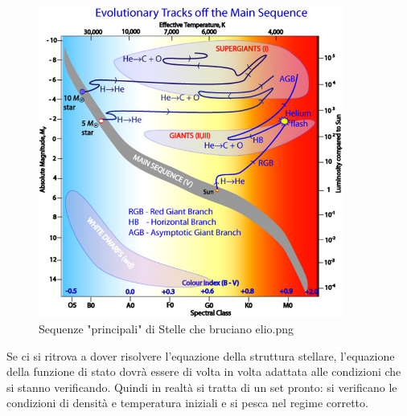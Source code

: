 \documentclass[a4paper,11pt]{article}
\begin{document}
\begin{figure}[h!!]
        \centering
        \includegraphics[width=10cm]{lezione 28 novembre/mainsequencehelium.png}
        \caption{Sequenze "principali" di Stelle che bruciano elio.png}
        \label{fig:lezione 28 novembre/mainsequencehelium}
    \end{figure}
\newpage
Se ci si ritrova a dover risolvere l'equazione della struttura stellare, l'equazione della funzione di stato dovrà essere di volta in volta adattata alle condizioni che si stanno verificando. Quindi in realtà si tratta di un set pronto: si verificano le condizioni di densità e temperatura iniziali e si pesca nel regime corretto. \\ 
\end{document}
